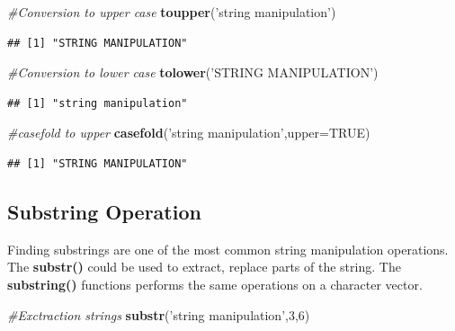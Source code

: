 \documentclass[]{book}
\newenvironment{Shaded}{\begin{snugshade}}{\end{snugshade}}
\newcommand{\KeywordTok}[1]{\textcolor[rgb]{0.13,0.29,0.53}{\textbf{{#1}}}}
\newcommand{\DataTypeTok}[1]{\textcolor[rgb]{0.13,0.29,0.53}{{#1}}}
\newcommand{\DecValTok}[1]{\textcolor[rgb]{0.00,0.00,0.81}{{#1}}}
\newcommand{\StringTok}[1]{\textcolor[rgb]{0.31,0.60,0.02}{{#1}}}
\newcommand{\CommentTok}[1]{\textcolor[rgb]{0.56,0.35,0.01}{\textit{{#1}}}}
\newcommand{\OtherTok}[1]{\textcolor[rgb]{0.56,0.35,0.01}{{#1}}}
\newcommand{\NormalTok}[1]{{#1}}
\begin{document}
\begin{Shaded}
\begin{Highlighting}[]
\CommentTok{#Conversion to upper case}
\KeywordTok{toupper}\NormalTok{(}\StringTok{'string manipulation'}\NormalTok{)}
\end{Highlighting}
\end{Shaded}

\begin{verbatim}
## [1] "STRING MANIPULATION"
\end{verbatim}

\begin{Shaded}
\begin{Highlighting}[]
\CommentTok{#Conversion to lower case}
\KeywordTok{tolower}\NormalTok{(}\StringTok{'STRING MANIPULATION'}\NormalTok{)}
\end{Highlighting}
\end{Shaded}

\begin{verbatim}
## [1] "string manipulation"
\end{verbatim}

\begin{Shaded}
\begin{Highlighting}[]
\CommentTok{#casefold to upper}
\KeywordTok{casefold}\NormalTok{(}\StringTok{'string manipulation'}\NormalTok{,}\DataTypeTok{upper=}\OtherTok{TRUE}\NormalTok{)}
\end{Highlighting}
\end{Shaded}

\begin{verbatim}
## [1] "STRING MANIPULATION"
\end{verbatim}

\subsection{Substring Operation}\label{substring-operation}

Finding substrings are one of the most common string manipulation
operations. The \textbf{substr()} could be used to extract, replace
parts of the string. The \textbf{substring()} functions performs the
same operations on a character vector.

\begin{Shaded}
\begin{Highlighting}[]
\CommentTok{#Exctraction strings}
\KeywordTok{substr}\NormalTok{(}\StringTok{'string manipulation'}\NormalTok{,}\DecValTok{3}\NormalTok{,}\DecValTok{6}\NormalTok{)}
\end{Highlighting}
\end{Shaded}
\end{document}
